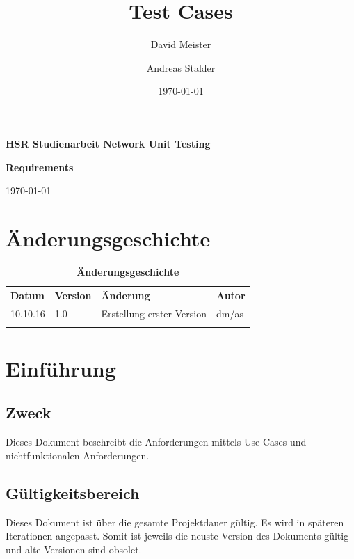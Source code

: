 \documentclass[a4,12pt]{scrartcl}
\title{Test Cases}
\author{David Meister \and Andreas Stalder}
\date{\today}
\begin{document}
\begin{titlepage}
	\centering
	\vspace{5cm}
	\begin{center}
	\end{center}
	\vspace{8cm}
	\raggedright
	{\bfseries HSR Studienarbeit Network Unit Testing\par}
	{\huge\bfseries Requirements\par}
	\vspace{1cm}
	{\theauthor \par}
	{\today\par}

\end{titlepage}

\section{Änderungsgeschichte}

\begin{table}[htb]
\centering
    \begin{tabular}{@{} l l l l@{}}\toprule    
    {Datum} & {Version} & {Änderung} & {Autor}\\ \midrule
    10.10.16 & 1.0 & Erstellung erster Version & dm/as\\ \addlinespace
    \end{tabular}
\caption{\textbf{Änderungsgeschichte}}
\end{table}

\newpage

\tableofcontents
\newpage


\section{Einführung}
\subsection{Zweck}
Dieses Dokument beschreibt die Anforderungen mittels Use Cases und nichtfunktionalen
Anforderungen.
\subsection{Gültigkeitsbereich}
Dieses Dokument ist über die gesamte Projektdauer gültig. Es wird in späteren Iterationen angepasst. Somit ist jeweils die neuste Version des Dokuments gültig und alte Versionen sind obsolet.
\end{document}
